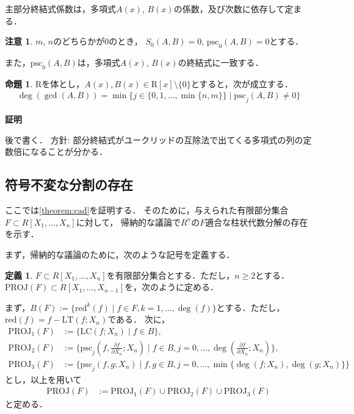 \documentclass[uplatex, dvipdfmx]{jsarticle}
\makeatletter
\renewenvironment{proof}[1][\proofname]{\par
  \pushQED{\qed}%
  \normalfont \topsep6\p@\@plus6\p@\relax
  \trivlist
  \item\relax
  {\bfseries
  #1\@addpunct{.}}\hspace\labelsep\ignorespaces
}{%
  \popQED\endtrivlist\@endpefalse
}
\newcommand{\psc}{\mathrm{psc}}
\newcommand{\PROJ}{\mathrm{PROJ}}
\theoremstyle{definition}
\newtheorem{definition}{定義}[section]
\newtheorem{proposition}{命題}[section]
\newtheorem{remark}{注意}[section]
\renewcommand{\proofname}{\textbf{証明}}
\makeatother
\begin{document}
主部分終結式係数は，多項式$A(x)$, $B(x)$の係数，及び次数に依存して定まる．

\begin{remark}
$m$, $n$のどちらかが$0$のとき，
$S_0(A,B) = 0$, $\psc_0(A,B) = 0$とする．

また，$\psc_0(A,B)$は，多項式$A(x)$, $B(x)$の終結式に一致する．
\end{remark}

\begin{proposition}\label{proposition:psc}
$\mathrm{R}$を体とし，$A(x), B(x) \in \mathrm{R}[x] \setminus \{0\}$とすると，次が成立する．
\begin{align*}
\deg(\gcd(A, B)) = \min \{ j  \in \{0,1, \dots, \min\{n,m\}\}\mid \psc_j(A,B) \neq 0\}
\end{align*}
\end{proposition}

\begin{proof}
後で書く．
方針: 部分終結式がユークリッドの互除法で出てくる多項式の列の定数倍になることが分かる．
\end{proof}

\subsection{符号不変な分割の存在}
ここでは\cref{theorem:cad}を証明する．
そのために，与えられた有限部分集合$F \subset R[X_1, \dots, X_n]$に対して，
帰納的な議論で$R^n$の$F$適合な柱状代数分解の存在を示す．

まず，帰納的な議論のために，次のような記号を定義する．

\begin{definition}
$F \subset R[X_1, \dots, X_n]$を有限部分集合とする．ただし，$n \geq 2$とする．
$\PROJ(F) \subset R[X_1, \dots, X_{n-1}]$を，次のように定める．

まず，$B(F) := \{ \mathrm{red}^k(f) \mid f \in F, k=1, \dots, \deg(f) \}$とする．ただし，$\mathrm{red}(f) = f - \mathrm{LT}(f; X_n)$である．
次に，
\begin{align*}
	\PROJ_1(F) &:= \{\mathrm{LC}(f;X_n) \mid f \in B\},\\
	\PROJ_2(F) &:= \{\psc_j(f, \frac{\partial f}{\partial X_n}; X_n) \mid f \in B, j =0, \dots, \deg(\frac{\partial f}{\partial X_n};X_n) \},\\
	\PROJ_3(F) &:= \{\psc_j(f,g;X_n) \mid f,g \in B, j = 0, \dots, \min\{\deg(f;X_n), \deg(g;X_n)\}\}
\end{align*}
とし，以上を用いて
\begin{align*}
	\PROJ(F) &:= \PROJ_1(F) \cup \PROJ_2(F) \cup \PROJ_3(F)
\end{align*}
と定める．
\end{definition}
\end{document}
